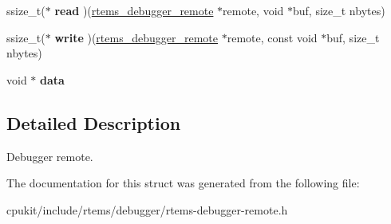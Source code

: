 \begin{DoxyCompactItemize}
\item 
\mbox{\label{structrtems__debugger__remote_aa6b678e38304a40eacc6c35aff3a10be}} 
ssize\+\_\+t($\ast$ {\bfseries read} )(\mbox{\hyperlink{structrtems__debugger__remote}{rtems\+\_\+debugger\+\_\+remote}} $\ast$remote, void $\ast$buf, size\+\_\+t nbytes)
\item 
\mbox{\label{structrtems__debugger__remote_a0f775be7a8f44c8f334cefd62f68c6ce}} 
ssize\+\_\+t($\ast$ {\bfseries write} )(\mbox{\hyperlink{structrtems__debugger__remote}{rtems\+\_\+debugger\+\_\+remote}} $\ast$remote, const void $\ast$buf, size\+\_\+t nbytes)
\item 
\mbox{\label{structrtems__debugger__remote_a66914a386882649a1411a081ffcd73d8}} 
void $\ast$ {\bfseries data}
\end{DoxyCompactItemize}


\subsection{Detailed Description}
Debugger remote. 

The documentation for this struct was generated from the following file\+:\begin{DoxyCompactItemize}
\item 
cpukit/include/rtems/debugger/rtems-\/debugger-\/remote.\+h\end{DoxyCompactItemize}
